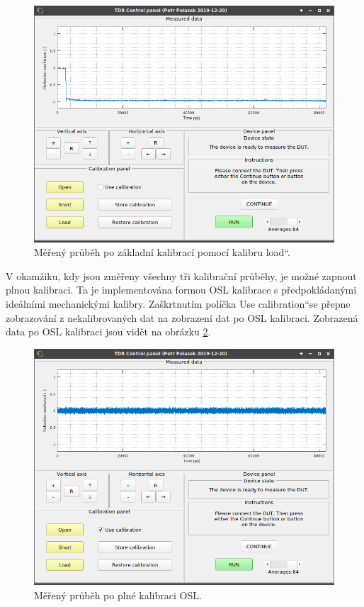 \begin{figure}[htbp]
\includegraphics[width=\textwidth,keepaspectratio]{images/gui/calibrations_performed.png}\caption{Měřený průběh po základní kalibrací pomocí kalibru \quotedblbase load\textquotedblleft .}\label{calibrations_performed}
\end{figure}

V okamžiku, kdy jsou změřeny všechny tři kalibrační průběhy, je možné zapnout plnou kalibraci. Ta je implementována formou OSL kalibrace s předpokládanými ideálními mechanickými kalibry. Zaškrtnutím políčka \quotedblbase Use calibration\textquotedblleft se přepne zobrazování z nekalibrovaných dat na zobrazení dat po OSL kalibraci. Zobrazená data po \acrshort{OSL} kalibraci jsou vidět na obrázku \ref{calibration_applied_on_new_short}.

\begin{figure}[htbp]
\includegraphics[width=\textwidth,keepaspectratio]{images/gui/calibration_applied_on_new_short.png}\caption{Měřený průběh po plné kalibraci OSL.}\label{calibration_applied_on_new_short}
\end{figure}